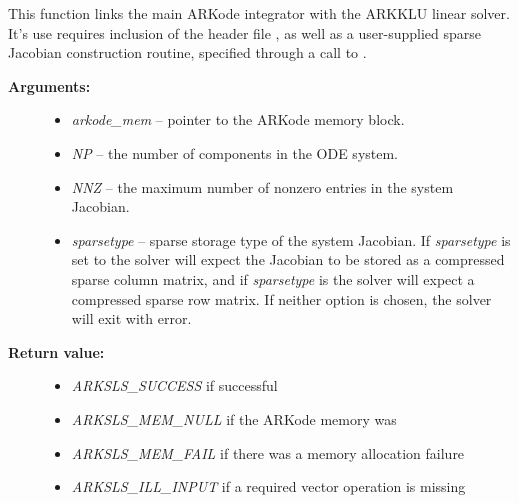 \documentclass[letterpaper,10pt,english]{sphinxmanual}
\begin{document}

\begin{fulllineitems}
\label{c_interface/User_callable:c.ARKKLU}
This function links the main ARKode integrator with the ARKKLU
linear solver.  It's use requires inclusion of the header file
, as well as a user-supplied sparse Jacobian
construction routine, specified through a call to
{\hyperref[c_interface/User_callable:c.ARKSlsSetSparseJacFn]{\emph{}}}.
\begin{description}
\item[{\textbf{Arguments:}}] \leavevmode\begin{itemize}
\item {} 
\emph{arkode\_mem} -- pointer to the ARKode memory block.

\item {} 
\emph{NP} -- the number of components in the ODE system.

\item {} 
\emph{NNZ} -- the maximum number of nonzero entries in the system
Jacobian.

\item {} 
\emph{sparsetype} -- sparse storage type of the system Jacobian.
If \emph{sparsetype} is set to  the solver will expect
the Jacobian to be stored as a compressed sparse column
matrix, and if \emph{sparsetype} is  the solver will
expect a compressed sparse row matrix.  If neither option is
chosen, the solver will exit with error.

\end{itemize}

\item[{\textbf{Return value:}}] \leavevmode\begin{itemize}
\item {} 
\emph{ARKSLS\_SUCCESS}   if successful

\item {} 
\emph{ARKSLS\_MEM\_NULL}  if the ARKode memory was 

\item {} 
\emph{ARKSLS\_MEM\_FAIL}  if there was a memory allocation failure

\item {} 
\emph{ARKSLS\_ILL\_INPUT} if a required vector operation is missing


\end{itemize}
\end{description}
\end{fulllineitems}
\end{document}
